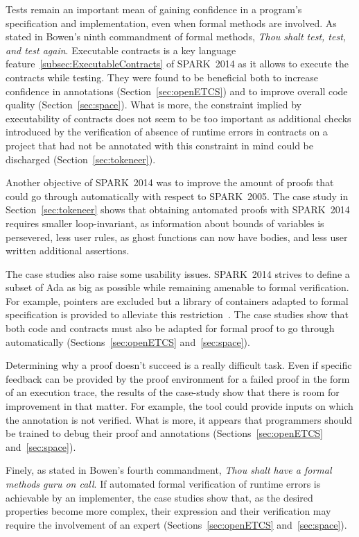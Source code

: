 \documentclass[10pt,a4paper,twocolumn]{article}
\newcommand{\oldspark}{SPARK~2005\xspace}
\newcommand{\newspark}{SPARK~2014\xspace}
\begin{document}
Tests remain an important mean of gaining confidence in a program's
specification and implementation, even when formal methods are involved. As
stated in Bowen's ninth commandment of formal methods, \emph{Thou shalt test,
test, and test again}. Executable contracts is a key language
feature~\ref{subsec:ExecutableContracts} of \newspark as it allows to execute
the contracts while testing. They were found to be beneficial both to increase
confidence in annotations (Section~\ref{sec:openETCS}) and to improve overall
code quality (Section~\ref{sec:space}). What is more, the constraint implied by
executability of contracts does not seem to be too important as additional
checks introduced by the verification of absence of runtime errors in contracts
on a project that had not be annotated with this constraint in mind could be
discharged (Section~\ref{sec:tokeneer}).

Another objective of \newspark was to improve the amount of proofs that could
go through automatically with respect to \oldspark. The case study in
Section~\ref{sec:tokeneer} shows that obtaining automated proofs with \newspark
requires smaller loop-invariant, as information about bounds of variables is
persevered, less user rules, as ghost functions can now have bodies, and less
user written additional assertions.

The case studies also raise some usability issues. 
\newspark strives to define a subset of Ada as big as possible while remaining
amenable to formal verification. For example, pointers are excluded but a
library of containers adapted to formal specification is provided to alleviate
this restriction~\cite{dross2011correct}. The case studies show that both code
and contracts must also be adapted for formal proof to go through automatically
(Sections~\ref{sec:openETCS} and~\ref{sec:space}).

Determining why a proof doesn't succeed is a really difficult task. Even if
specific feedback can be provided by the proof environment for a failed proof
in the form of an execution trace, the results of the case-study show
that there is room for improvement in that matter. For example, the
tool could provide inputs on which the annotation is not verified.
What is more, it appears that programmers should be trained to debug their proof
and annotations (Sections~\ref{sec:openETCS} and~\ref{sec:space}).

Finely, as stated in Bowen's fourth commandment, \emph{Thou shalt have a formal
methods guru on call}. If automated formal verification of runtime errors is
achievable by an implementer, the case studies show that, as the desired
properties become more complex, their expression and their verification may
require the involvement of an expert (Sections~\ref{sec:openETCS}
and~\ref{sec:space}).
\end{document}

